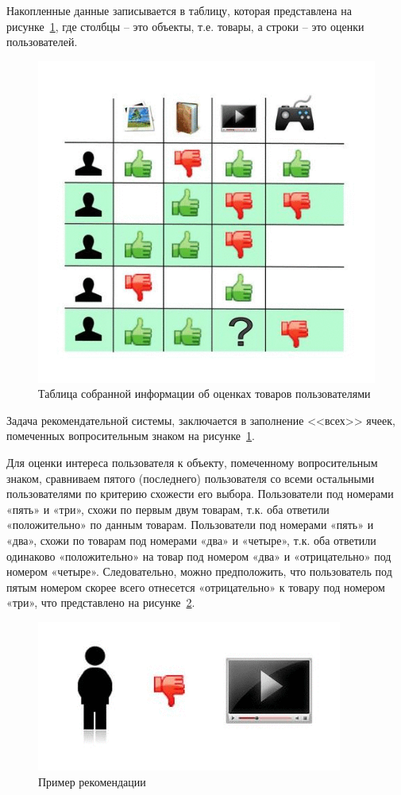 \documentclass[a4paper,14pt,openany,final]{extreport} %
\def\oldcaption{} \let\oldcaption=\caption
\def\caption{\stepcounter{captionsnum}\oldcaption}
\begin{document}
Накопленные данные записывается в таблицу, которая представлена на рисунке~\ref{fig:collab2}, где столбцы -- это объекты, т.е. товары, а строки -- это оценки пользователей.
\begin{figure}[htb]
  \centering
  \includegraphics[width=0.5\linewidth]{collab2.png}
  \caption{Таблица собранной информации об оценках товаров пользователями}
  \label{fig:collab2}
\end{figure}

Задача рекомендательной системы, заключается в заполнение <<всех>> ячеек, помеченных вопросительным знаком на рисунке~\ref{fig:collab2}.

Для оценки интереса пользователя к объекту, помеченному вопросительным знаком, сравниваем пятого (последнего) пользователя со всеми остальными пользователями по критерию схожести его выбора. Пользователи под номерами «пять» и «три», схожи по первым двум товарам, т.к. оба ответили «положительно» по данным товарам. Пользователи под номерами «пять» и «два», схожи по товарам под номерами «два» и «четыре», т.к. оба ответили одинаково «положительно» на товар под номером «два» и «отрицательно» под номером «четыре». Следовательно, можно предположить, что пользователь под пятым номером скорее всего отнесется «отрицательно» к товару под номером «три», что представлено на рисунке~\ref{fig:collab3}.

\begin{figure}[htb]
  \centering
  \includegraphics[width=0.5\linewidth]{collab3.png}
  \caption{Пример рекомендации}
  \label{fig:collab3}
\end{figure}
\end{document}

